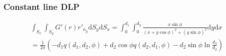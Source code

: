 \documentclass[a4paper,11pt]{article}
\newcommand{\td}{\mathrm{d}}
\begin{document}
\subsubsection{Constant line DLP}

\begin{multline}
\int_{S_{x}} \int_{S_{y}} G'(r) r'_{n_{y}} \td S_y \td S_x =
\int_{0}^{d_1} \int_{0}^{d_2}
\frac{x\sin\phi}{(x+y \cos\phi)^2 + (y\sin\phi)^2}
\td y \td x \\
=
\frac{1}{2\pi}\left(-d_1 q(d_1, d_2, \phi) + d_2 \cos\phi q(d_2, d_1, \phi)
- d_2 \sin\phi \ln \frac{d_3}{d_2}\right)
\end{multline}
\end{document}

